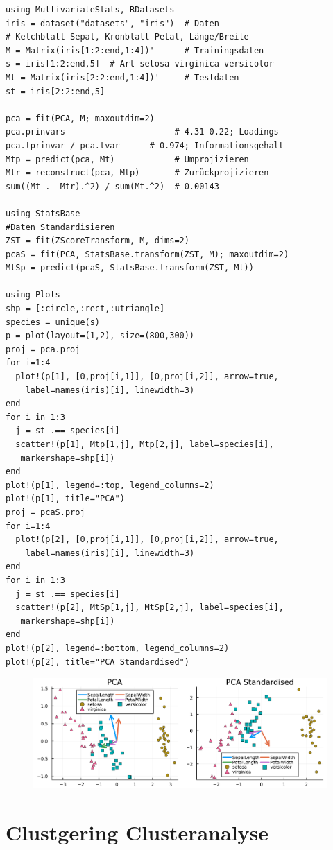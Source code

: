 \documentclass[10pt,twocolumn]{scrartcl}
\begin{document}
\begin{lstlisting}
using MultivariateStats, RDatasets
iris = dataset("datasets", "iris")  # Daten
# Kelchblatt-Sepal, Kronblatt-Petal, Länge/Breite
M = Matrix(iris[1:2:end,1:4])'      # Trainingsdaten
s = iris[1:2:end,5]  # Art setosa virginica versicolor
Mt = Matrix(iris[2:2:end,1:4])'     # Testdaten
st = iris[2:2:end,5]

pca = fit(PCA, M; maxoutdim=2)
pca.prinvars                      # 4.31 0.22; Loadings
pca.tprinvar / pca.tvar      # 0.974; Informationsgehalt
Mtp = predict(pca, Mt)            # Umprojizieren
Mtr = reconstruct(pca, Mtp)       # Zurückprojizieren
sum((Mt .- Mtr).^2) / sum(Mt.^2)  # 0.00143

using StatsBase
#Daten Standardisieren
ZST = fit(ZScoreTransform, M, dims=2)
pcaS = fit(PCA, StatsBase.transform(ZST, M); maxoutdim=2)
MtSp = predict(pcaS, StatsBase.transform(ZST, Mt))

using Plots
shp = [:circle,:rect,:utriangle]
species = unique(s)
p = plot(layout=(1,2), size=(800,300))
proj = pca.proj
for i=1:4
  plot!(p[1], [0,proj[i,1]], [0,proj[i,2]], arrow=true,
    label=names(iris)[i], linewidth=3)
end
for i in 1:3
  j = st .== species[i]
  scatter!(p[1], Mtp[1,j], Mtp[2,j], label=species[i],
   markershape=shp[i])
end
plot!(p[1], legend=:top, legend_columns=2)
plot!(p[1], title="PCA")
proj = pcaS.proj
for i=1:4
  plot!(p[2], [0,proj[i,1]], [0,proj[i,2]], arrow=true,
    label=names(iris)[i], linewidth=3)
end
for i in 1:3
  j = st .== species[i]
  scatter!(p[2], MtSp[1,j], MtSp[2,j], label=species[i],
   markershape=shp[i])
end
plot!(p[2], legend=:bottom, legend_columns=2)
plot!(p[2], title="PCA Standardised")
\end{lstlisting}

\begin{figure}[h]
  \centering
  \includegraphics[width=.95\columnwidth]{pca.pdf}
\end{figure}

\section{Clustgering Clusteranalyse}
\end{document}

